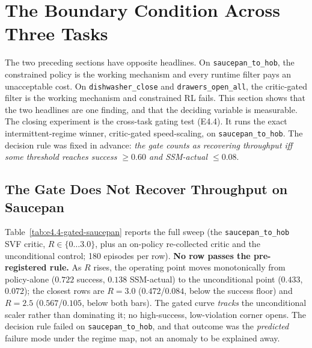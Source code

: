 \documentclass[11pt,a4paper]{report}
\newcommand{\ssm}{SSM}
\begin{document}
\section{The Boundary Condition Across Three Tasks}
\label{sec:results:boundary}

The two preceding sections have opposite headlines. On \texttt{saucepan\_to\_hob}, the
constrained policy is the working mechanism and every runtime filter
pays an unacceptable cost. On \texttt{dishwasher\_close} and \texttt{drawers\_open\_all}, the
critic-gated filter is the working mechanism and constrained RL fails.
This section shows that the two headlines are one finding, and that
the deciding variable is measurable. The closing experiment is the
cross-task gating test (E4.4). It runs the exact intermittent-regime
winner, critic-gated speed-scaling, on \texttt{saucepan\_to\_hob}.
The decision rule was fixed in advance: \emph{the gate counts as
recovering throughput iff some threshold reaches success $\geq 0.60$
and \ssm{}-actual $\leq 0.08$}.

\subsection{The Gate Does Not Recover Throughput on Saucepan}

Table~\ref{tab:e4.4-gated-saucepan} reports the full sweep (the
\texttt{saucepan\_to\_hob} SVF critic, $R \in \{0 \ldots 3.0\}$, plus an on-policy
re-collected critic and the unconditional control; 180 episodes per
row). \textbf{No row passes the pre-registered rule.} As $R$ rises,
the operating point moves monotonically from policy-alone
($0.722$ success, $0.138$ \ssm{}-actual) to the unconditional point
($0.433$, $0.072$); the closest rows are $R = 3.0$ ($0.472$/$0.084$,
below the success floor) and $R = 2.5$ ($0.567$/$0.105$, below both
bars). The gated curve \emph{tracks} the unconditional scaler rather
than dominating it; no high-success, low-violation corner opens.
The decision rule failed on \texttt{saucepan\_to\_hob}, and that outcome was the
\emph{predicted} failure mode under the regime map, not an anomaly to
be explained away.
\end{document}
